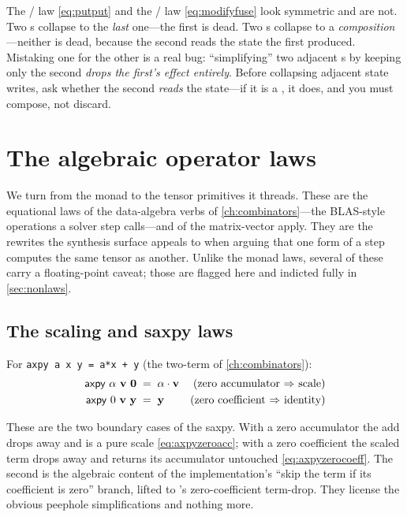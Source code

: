 \begin{pitfall}
The / law \eqref{eq:putput} and the /
law \eqref{eq:modifyfuse} look symmetric and are not. Two s collapse to the
\emph{last} one---the first is dead. Two s collapse to a
\emph{composition}---neither is dead, because the second  reads the state
the first produced. Mistaking one for the other is a real bug: ``simplifying'' two
adjacent s by keeping only the second \emph{drops the first's effect
entirely}. Before collapsing adjacent state writes, ask whether the second
\emph{reads} the state---if it is a , it does, and you must compose, not
discard.
\end{pitfall}

\section{The algebraic operator laws}
\label{sec:coplaws}

We turn from the monad to the tensor primitives it threads. These are the equational
laws of the data-algebra verbs of \cref{ch:combinators}---the BLAS-style operations a
solver step calls---and of the matrix-vector apply. They are the rewrites the
synthesis surface appeals to when arguing that one form of a step computes the same
tensor as another. Unlike the monad laws, several of these carry a floating-point
caveat; those are flagged here and indicted fully in \cref{sec:nonlaws}.

\subsection{The scaling and saxpy laws}

\begin{lemma}
\label{lem:axpy}
For \lstinline[style=l4style]|axpy a x y = a*x + y| (the two-term
 of \cref{ch:combinators}):
\begin{align}
  \textsf{axpy}\ \alpha\ \mathbf{v}\ \mathbf{0} &\;=\; \alpha \cdot \mathbf{v}
    & \text{(zero accumulator $\Rightarrow$ scale)} \label{eq:axpyzeroacc}\\
  \textsf{axpy}\ 0\ \mathbf{v}\ \mathbf{y} &\;=\; \mathbf{y}
    & \text{(zero coefficient $\Rightarrow$ identity)} \label{eq:axpyzerocoeff}
\end{align}
\end{lemma}

\noindent These are the two boundary cases of the saxpy. With a zero accumulator the
add drops away and  is a pure scale \eqref{eq:axpyzeroacc}; with a zero
coefficient the scaled term drops away and  returns its accumulator
untouched \eqref{eq:axpyzerocoeff}. The second is the algebraic content of the
implementation's ``skip the term if its coefficient is zero'' branch, lifted to
's zero-coefficient term-drop. They license the obvious
peephole simplifications and nothing more.


